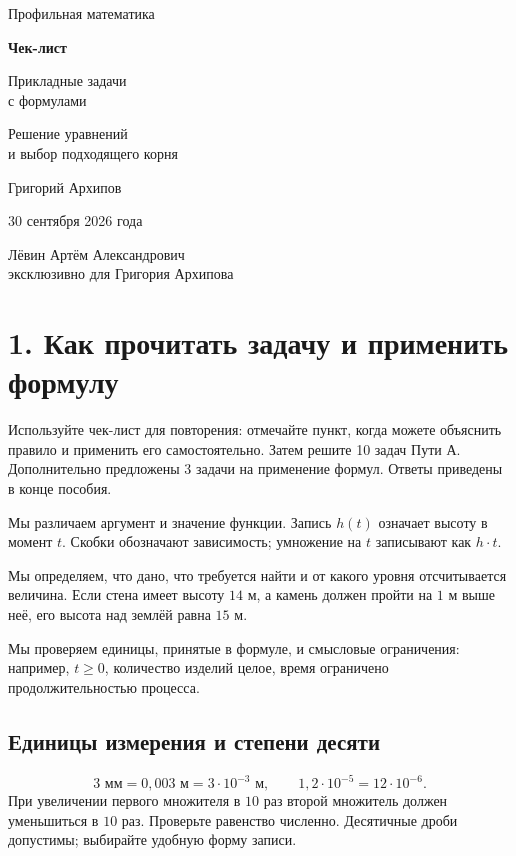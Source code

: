 \documentclass[a4paper,12pt]{article}
\newcommand{\heading}[1]{\section*{\color{darkaccent}#1}}
\newcommand{\subheading}[1]{\subsection*{\color{darkaccent}#1}}
\newcommand{\checkitem}[1]{\par\noindent\makebox[6mm][l]{$\square$}\begin{minipage}[t]{\dimexpr\linewidth-6mm\relax}\raggedright #1\end{minipage}\par}
\begin{document}
\raggedright
\hypersetup{pageanchor=false}
\begin{titlepage}
\centering
\vspace*{22mm}
{\large Профильная математика\par}
\vspace{13mm}
{\Huge\bfseries Чек-лист\par}
\vspace{8mm}
{\LARGE Прикладные задачи\\с формулами\par}
\vspace{10mm}
{\large Решение уравнений\\и выбор подходящего корня\par}
\vspace{13mm}
{\large Григорий Архипов\par}
\vspace{6mm}
{\large 30 сентября 2026 года\par}
\vfill
{\normalsize Лёвин Артём Александрович\\эксклюзивно для Григория Архипова\par}
\vspace{14mm}
\vspace*{5mm}
\end{titlepage}
\hypersetup{pageanchor=true}

\heading{1. Как прочитать задачу и применить формулу}
Используйте чек-лист для повторения: отмечайте пункт, когда можете объяснить правило и применить его самостоятельно. Затем решите 10 задач Пути А. Дополнительно предложены 3 задачи на применение формул. Ответы приведены в конце пособия.

\checkitem{Мы различаем аргумент и значение функции. Запись $h(t)$ означает высоту в момент $t$. Скобки обозначают зависимость; умножение на $t$ записывают как $h\cdot t$.}
\checkitem{Мы определяем, что дано, что требуется найти и от какого уровня отсчитывается величина. Если стена имеет высоту $14$ м, а камень должен пройти на $1$ м выше неё, его высота над землёй равна $15$ м.}
\checkitem{Мы проверяем единицы, принятые в формуле, и смысловые ограничения: например, $t\ge0$, количество изделий целое, время ограничено продолжительностью процесса.}

\subheading{Единицы измерения и степени десяти}
\[
3\text{ мм}=0,003\text{ м}=3\cdot10^{-3}\text{ м},\qquad
1,2\cdot10^{-5}=12\cdot10^{-6}.
\]
При увеличении первого множителя в $10$ раз второй множитель должен уменьшиться в $10$ раз. Проверьте равенство численно. Десятичные дроби допустимы; выбирайте удобную форму записи.
\end{document}
